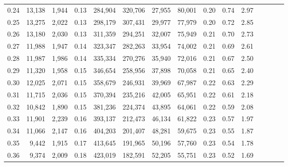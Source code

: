 \begin{tabular}{rrrcrrrrrrrrrrr}
0.24 &  13,138 &  1,944 &                                       0.13 &  284,904 &  320,706 &   27,955 &   80,001 &  0.20 &  0.74 &                         2.97 \\
0.25 &  13,275 &  2,022 &                                       0.13 &  298,179 &  307,431 &   29,977 &   77,979 &  0.20 &  0.72 &                         2.85 \\
0.26 &  13,180 &  2,030 &                                       0.13 &  311,359 &  294,251 &   32,007 &   75,949 &  0.21 &  0.70 &                         2.73 \\
0.27 &  11,988 &  1,947 &                                       0.14 &  323,347 &  282,263 &   33,954 &   74,002 &  0.21 &  0.69 &                         2.61 \\
0.28 &  11,987 &  1,986 &                                       0.14 &  335,334 &  270,276 &   35,940 &   72,016 &  0.21 &  0.67 &                         2.50 \\
0.29 &  11,320 &  1,958 &                                       0.15 &  346,654 &  258,956 &   37,898 &   70,058 &  0.21 &  0.65 &                         2.40 \\
0.30 &  12,025 &  2,071 &                                       0.15 &  358,679 &  246,931 &   39,969 &   67,987 &  0.22 &  0.63 &                         2.29 \\
0.31 &  11,715 &  2,036 &                                       0.15 &  370,394 &  235,216 &   42,005 &   65,951 &  0.22 &  0.61 &                         2.18 \\
0.32 &  10,842 &  1,890 &                                       0.15 &  381,236 &  224,374 &   43,895 &   64,061 &  0.22 &  0.59 &                         2.08 \\
0.33 &  11,901 &  2,239 &                                       0.16 &  393,137 &  212,473 &   46,134 &   61,822 &  0.23 &  0.57 &                         1.97 \\
0.34 &  11,066 &  2,147 &                                       0.16 &  404,203 &  201,407 &   48,281 &   59,675 &  0.23 &  0.55 &                         1.87 \\
0.35 &   9,442 &  1,915 &                                       0.17 &  413,645 &  191,965 &   50,196 &   57,760 &  0.23 &  0.54 &                         1.78 \\
0.36 &   9,374 &  2,009 &                                       0.18 &  423,019 &  182,591 &   52,205 &   55,751 &  0.23 &  0.52 &                         1.69 \\

\end{tabular}
